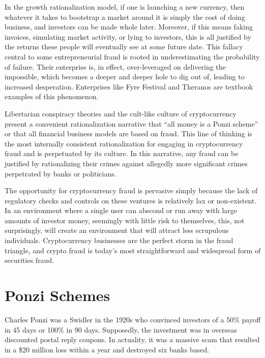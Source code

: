 In the growth rationalization model, if one is launching a new currency, then
whatever it takes to bootstrap a market around it is simply the cost of doing
business, and investors can be made whole later. Moreover, if this means faking
invoices, simulating market activity, or lying to investors, this is all
justified by the returns these people will eventually see at some future date.
This fallacy central to some entrepreneurial fraud is rooted in underestimating
the probability of failure. Their enterprise is, in effect, over-leveraged on
delivering the impossible, which becomes a deeper and deeper hole to dig out of,
leading to increased desperation. Enterprises like Fyre Festival and Theranos
are textbook examples of this phenomenon.


Libertarian conspiracy theories and the cult-like culture of cryptocurrency
present a convenient rationalization narrative that ``all money is a Ponzi
scheme'' or that all financial business models are based on fraud. This line of
thinking is the most internally consistent rationalization for engaging in
cryptocurrency fraud and is perpetuated by its culture. In this narrative, any
fraud can be justified by rationalizing their crimes against allegedly more
significant crimes perpetrated by banks or politicians.

The opportunity for cryptocurrency fraud is pervasive simply because the lack of
regulatory checks and controls on these ventures is relatively lax or
non-existent. In an environment where a single user can abscond or run away with
large amounts of investor money, seemingly with little risk to themselves, this,
not surprisingly, will create an environment that will attract less scrupulous
individuals. Cryptocurrency businesses are the perfect storm in the fraud
triangle, and crypto fraud is today's most straightforward and widespread form
of securities fraud.

\section{Ponzi Schemes}

Charles Ponzi was a Swidler in the 1920s who convinced investors of a 50\%
payoff in 45 days or 100\% in 90 days. Supposedly, the investment was in
overseas discounted postal reply coupons. In actuality, it was a massive scam
that resulted in a \$20 million loss within a year and destroyed six banks based.

